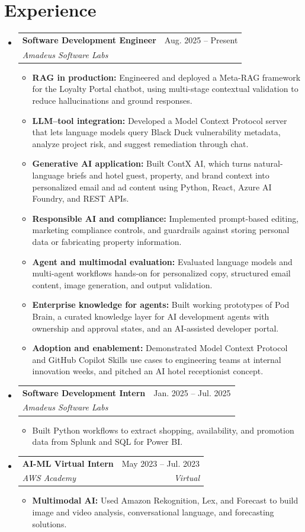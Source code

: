 \documentclass[a4paper,11pt]{article}
\makeatletter
\newcommand{\entry}[4]{\item\begin{tabularx}{\textwidth}{@{}Xr@{}}\textbf{#1}& #2\\\textit{\small #3}&\textit{\small #4}\end{tabularx}\vspace{-5pt}}
\newcommand{\bulletpoint}[1]{\item\small{#1}}
\makeatother
\begin{document}
\section{Experience}
\begin{itemize}[leftmargin=0in,label={}]
  \entry{Software Development Engineer}{Aug. 2025 -- Present}{Amadeus Software Labs}{}
  \begin{itemize}
    \bulletpoint{\textbf{RAG in production:} Engineered and deployed a Meta-RAG framework for the Loyalty Portal chatbot, using multi-stage contextual validation to reduce hallucinations and ground responses.}
    \bulletpoint{\textbf{LLM--tool integration:} Developed a Model Context Protocol server that lets language models query Black Duck vulnerability metadata, analyze project risk, and suggest remediation through chat.}
    \bulletpoint{\textbf{Generative AI application:} Built ContX AI, which turns natural-language briefs and hotel guest, property, and brand context into personalized email and ad content using Python, React, Azure AI Foundry, and REST APIs.}
    \bulletpoint{\textbf{Responsible AI and compliance:} Implemented prompt-based editing, marketing compliance controls, and guardrails against storing personal data or fabricating property information.}
    \bulletpoint{\textbf{Agent and multimodal evaluation:} Evaluated language models and multi-agent \mbox{workf{}lows} hands-on for personalized copy, structured email content, image generation, and output validation.}
    \bulletpoint{\textbf{Enterprise knowledge for agents:} Built working prototypes of Pod Brain, a curated knowledge layer for AI development agents with ownership and approval states, and an AI-assisted developer portal.}
    \bulletpoint{\textbf{Adoption and enablement:} Demonstrated Model Context Protocol and GitHub Copilot Skills use cases to engineering teams at internal innovation weeks, and pitched an AI hotel receptionist concept.}
  \end{itemize}
  \entry{Software Development Intern}{Jan. 2025 -- Jul. 2025}{Amadeus Software Labs}{}
  \begin{itemize}
    \bulletpoint{Built Python workf{}lows to extract shopping, availability, and promotion data from Splunk and SQL for Power BI.}
  \end{itemize}
  \entry{AI-ML Virtual Intern}{May 2023 -- Jul. 2023}{AWS Academy}{Virtual}
  \begin{itemize}
    \bulletpoint{\textbf{Multimodal AI:} Used Amazon Rekognition, Lex, and Forecast to build image and video analysis, conversational language, and forecasting solutions.}
  \end{itemize}
\end{itemize}
\end{document}
